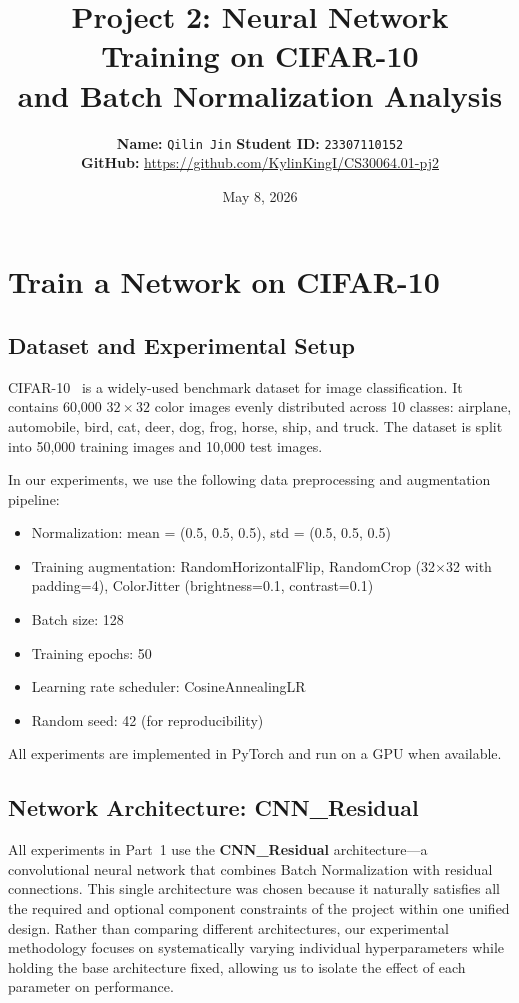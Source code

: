 \documentclass[11pt,a4paper]{article}
\title{\textbf{Project 2: Neural Network Training on CIFAR-10\\[4pt]
        and Batch Normalization Analysis}}
\author{
    \textbf{Name:} \texttt{Qilin Jin} \quad
    \textbf{Student ID:} \texttt{23307110152} \\[6pt]
    \textbf{GitHub:} \url{https://github.com/KylinKingI/CS30064.01-pj2} \\[4pt]
}
\date{May 8, 2026}
\begin{document}
\maketitle

\section{Train a Network on CIFAR-10}
\label{sec:cifar10}

\subsection{Dataset and Experimental Setup}

CIFAR-10~\cite{krizhevsky2009learning} is a widely-used benchmark dataset for image classification. It contains 60,000 $32\times32$ color images evenly distributed across 10 classes: airplane, automobile, bird, cat, deer, dog, frog, horse, ship, and truck. The dataset is split into 50,000 training images and 10,000 test images.

In our experiments, we use the following data preprocessing and augmentation pipeline:
\begin{itemize}[nosep]
    \item Normalization: mean = (0.5, 0.5, 0.5), std = (0.5, 0.5, 0.5)
    \item Training augmentation: RandomHorizontalFlip, RandomCrop (32$\times$32 with padding=4), ColorJitter (brightness=0.1, contrast=0.1)
    \item Batch size: 128
    \item Training epochs: 50
    \item Learning rate scheduler: CosineAnnealingLR
    \item Random seed: 42 (for reproducibility)
\end{itemize}

All experiments are implemented in PyTorch and run on a GPU when available.

\subsection{Network Architecture: CNN\_Residual}

All experiments in Part~1 use the \textbf{CNN\_Residual} architecture—a convolutional neural network that combines Batch Normalization with residual connections. This single architecture was chosen because it naturally satisfies all the required and optional component constraints of the project within one unified design. Rather than comparing different architectures, our experimental methodology focuses on systematically varying individual hyperparameters while holding the base architecture fixed, allowing us to isolate the effect of each parameter on performance.
\end{document}
